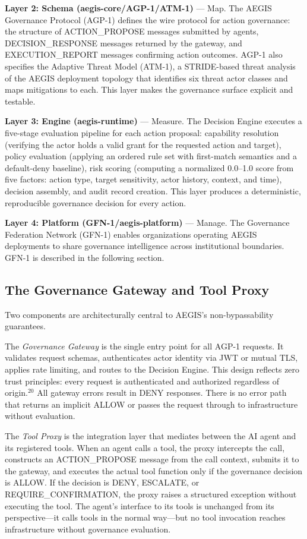 \documentclass{IEEEcsmag}
\begin{document}
{\bf Layer 2: Schema (aegis-core/AGP-1/ATM-1)} --- Map. The AEGIS Governance Protocol (AGP-1) defines the wire protocol for action governance: the structure of ACTION\_PROPOSE messages submitted by agents, DECISION\_RESPONSE messages returned by the gateway, and EXECUTION\_REPORT messages confirming action outcomes. AGP-1 also specifies the Adaptive Threat Model (ATM-1), a STRIDE-based threat analysis of the AEGIS deployment topology that identifies six threat actor classes and maps mitigations to each. This layer makes the governance surface explicit and testable.

{\bf Layer 3: Engine (aegis-runtime)} --- Measure. The Decision Engine executes a five-stage evaluation pipeline for each action proposal: capability resolution (verifying the actor holds a valid grant for the requested action and target), policy evaluation (applying an ordered rule set with first-match semantics and a default-deny baseline), risk scoring (computing a normalized 0.0--1.0 score from five factors: action type, target sensitivity, actor history, context, and time), decision assembly, and audit record creation. This layer produces a deterministic, reproducible governance decision for every action.

{\bf Layer 4: Platform (GFN-1/aegis-platform)} --- Manage. The Governance Federation Network (GFN-1) enables organizations operating AEGIS deployments to share governance intelligence across institutional boundaries. GFN-1 is described in the following section.

\subsection{The Governance Gateway and Tool Proxy}

Two components are architecturally central to AEGIS's non-bypassability guarantees.

The {\it Governance Gateway} is the single entry point for all AGP-1 requests. It validates request schemas, authenticates actor identity via JWT or mutual TLS, applies rate limiting, and routes to the Decision Engine. This design reflects zero trust principles: every request is authenticated and authorized regardless of origin.$^{20}$ All gateway errors result in DENY responses. There is no error path that returns an implicit ALLOW or passes the request through to infrastructure without evaluation.

The {\it Tool Proxy} is the integration layer that mediates between the AI agent and its registered tools. When an agent calls a tool, the proxy intercepts the call, constructs an ACTION\_PROPOSE message from the call context, submits it to the gateway, and executes the actual tool function only if the governance decision is ALLOW. If the decision is DENY, ESCALATE, or REQUIRE\_CONFIRMATION, the proxy raises a structured exception without executing the tool. The agent's interface to its tools is unchanged from its perspective---it calls tools in the normal way---but no tool invocation reaches infrastructure without governance evaluation.
\end{document}
